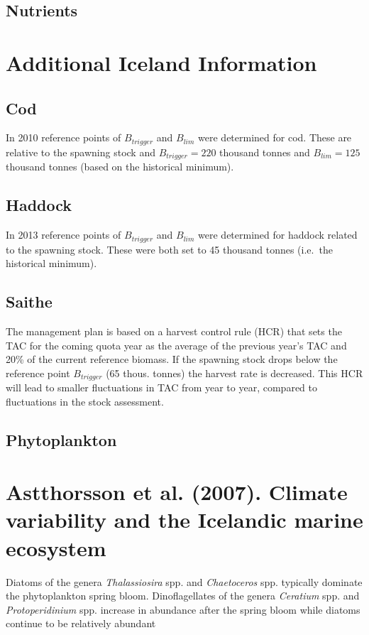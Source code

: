 \documentclass{report}
\begin{document}
\subsection{Nutrients}  


\section{Additional Iceland Information}

\subsection{Cod}
In 2010 reference points of $B_{trigger}$ and $B_{lim}$ were determined for cod. These are relative to the spawning stock and $B_{trigger} = 220$ thousand tonnes and $B_{lim} = 125$ thousand tonnes (based on the historical minimum). 

\subsection{Haddock}
In 2013 reference points of $B_{trigger}$ and $B_{lim}$ were determined for haddock related to the spawning stock. These were both set to 45 thousand tonnes (i.e.\ the historical minimum).

\subsection{Saithe}

The management plan is based on a harvest control rule (HCR) that sets the TAC for the coming quota year as the average of the previous year’s TAC and 20\% of the current reference biomass. If the spawning stock drops below the reference point $B_{trigger}$ (65 thous. tonnes) the harvest rate is decreased. This HCR will lead to smaller fluctuations in TAC from year to year, compared to fluctuations in the stock assessment.

\subsection{Phytoplankton}


\section{Astthorsson et al. (2007). Climate variability and the Icelandic marine ecosystem}
Diatoms of the genera \textit{Thalassiosira} spp. and \textit{Chaetoceros} spp. typically dominate the phytoplankton spring bloom. Dinoflagellates of the genera \textit{Ceratium} spp. and \textit{Protoperidinium} spp. increase in abundance after the spring bloom while diatoms continue to be relatively abundant
\end{document}
